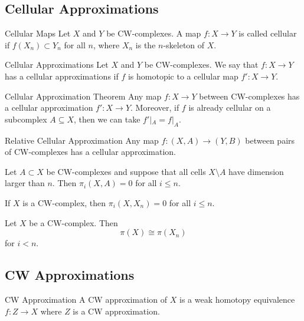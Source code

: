 \documentclass[a4paper]{article}
\begin{document}
\subsection{Cellular Approximations}
\begin{defn}{Cellular Maps}{} Let $X$ and $Y$ be CW-complexes. A map $f:X\to Y$ is called cellular if $f(X_n)\subset Y_n$ for all $n$, where $X_n$ is the $n$-skeleton of $X$. 
\end{defn}

\begin{defn}{Cellular Approximations}{} Let $X$ and $Y$ be CW-complexes. We say that $f:X\to Y$ has a cellular approximations if $f$ is homotopic to a cellular map $f':X\to Y$. 
\end{defn}

\begin{thm}{Cellular Approximation Theorem}{} Any map $f:X\to Y$ between CW-complexes has a cellular approximation $f':X\to Y$. Moreover, if $f$ is already cellular on a subcomplex $A\subseteq X$, then we can take $f'|_A=f|_A$. 
\end{thm}

\begin{thm}{Relative Cellular Approximation}{} Any map $f:(X,A)\to (Y,B)$ between pairs of CW-complexes has a cellular approximation. 
\end{thm}

\begin{crl}{}{} Let $A\subset X$ be CW-complexes and suppose that all cells $X\setminus A$ have dimension larger than $n$. Then $\pi_i(X,A)=0$ for all $i\leq n$. 
\end{crl}

\begin{crl}{}{} If $X$ is a CW-complex, then $\pi_i(X,X_n)=0$ for all $i\leq n$. 
\end{crl}

\begin{crl}{}{} Let $X$ be a CW-complex. Then $$\pi(X)\cong\pi(X_n)$$ for $i<n$. 
\end{crl}

\subsection{CW Approximations}
\begin{defn}{CW Approximation}{} A CW approximation of $X$ is a weak homotopy equivalence $f:Z\to X$ where $Z$ is a CW approximation. 
\end{defn}
\end{document}
